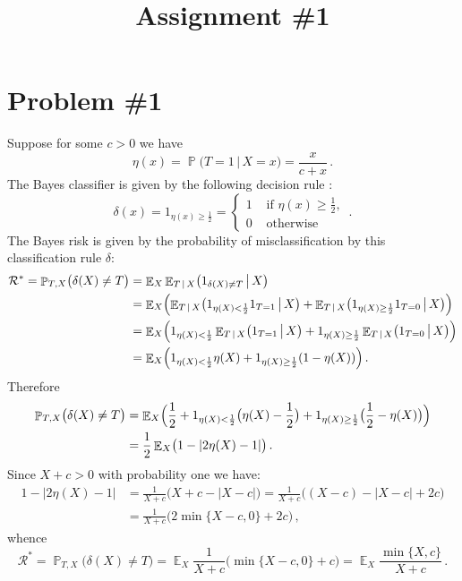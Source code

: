 \documentclass[a4paper,12pt]{extarticle}
\title{Assignment \#1}
\author{}
\newcommand{\pr}{\mathop{\mathbb{P}}\nolimits}
\newcommand{\ex}{\mathop{\mathbb{E}}\nolimits}
\begin{document}
\maketitle

\section{Problem \#1} %
\label{sec:problem_1}
Suppose for some $c>0$ we have
$$ \eta(x) = \pr\bigl(T=1\,\big|\, X=x\bigr) = \frac{x}{c+x} \,.$$
The Bayes classifier is given by the following decision rule :
$$\delta(x)
  = 1_{\eta(x) \geq \frac{1}{2}}
  = \begin{cases} 1 & \text{ if } \eta(x)\geq \frac{1}{2},\\
          0 & \text{ otherwise}
    \end{cases}
  \,. $$
The Bayes risk is given by the probability of misclassification by this classification
rule $\delta$:
\begin{align*}
  \mathcal{R}^* = \pr_{T,X}\bigl(\delta(X)\neq T\bigr)
    &= \ex_X \ex_{T\,|\,X}\bigl(1_{\delta(X)\neq T}\,\big|\,X\bigr) \\
    &= \ex_X \Bigl(
      \ex_{T\,|\,X}\bigl(1_{\eta(X) < \frac{1}{2}}1_{T=1}\,\big|\,X\bigr)
       + \ex_{T\,|\,X}\bigl(1_{\eta(X)\geq \frac{1}{2}}1_{T=0}\,\big|\,X\bigr) \Bigr) \\
    &= \ex_X \Bigl(
      1_{\eta(X) < \frac{1}{2}}\ex_{T\,|\,X}\bigl(1_{T=1}\,\big|\,X\bigr)
       + 1_{\eta(X)\geq \frac{1}{2}}\ex_{T\,|\,X}\bigl(1_{T=0}\,\big|\,X\bigr) \Bigr) \\
    &= \ex_X \Bigl(
      1_{\eta(X) < \frac{1}{2}}\eta(X)
       + 1_{\eta(X)\geq \frac{1}{2}}(1-\eta(X)) \Bigr)
    \,.
\end{align*}
Therefore 
\begin{align*}
  \pr_{T,X}\bigl(\delta(X)\neq T\bigr)
  &= \ex_X \Bigl(\frac{1}{2} + 
     1_{\eta(X) < \frac{1}{2}}\bigl(\eta(X)-\frac{1}{2}\bigr)
       + 1_{\eta(X)\geq \frac{1}{2}}\bigl(\frac{1}{2}-\eta(X)\bigr) \Bigr) \\
  &= \frac{1}{2} \ex_X \bigl( 1 - \lvert2\eta(X)-1\rvert \bigr) \,.
\end{align*}
Since $X+c>0$ with probability one we have:
\begin{align*}
  1 - \lvert2\eta(X)-1\rvert 
  &= \frac{1}{X+c} \bigl( X + c - \lvert X - c \rvert \bigr)
   = \frac{1}{X+c} \bigl( (X - c) - \lvert X - c \rvert + 2c\bigr) \\
  &= \frac{1}{X+c} \bigl( 2 \min\{X - c, 0\} + 2c\bigr) \,,
\end{align*}
whence
$$ \mathcal{R}^*
  = \pr_{T,X}\bigl(\delta(X)\neq T\bigr)
  = \ex_X \frac{1}{X+c} \bigl( \min\{X - c, 0\} + c\bigr)
  = \ex_X \frac{\min\{X, c\}}{X+c}
  \,.$$
\end{document}
